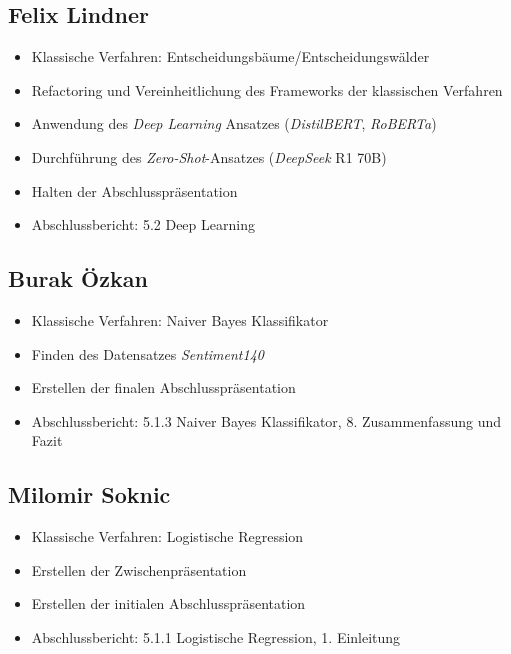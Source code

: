 \begin{multicols}{2}
\subsection{Felix Lindner}
\begin{itemize}
    \item Klassische Verfahren: Entscheidungsbäume/Entscheidungswälder
    \item Refactoring und Vereinheitlichung des Frameworks der klassischen Verfahren
    \item Anwendung des \textit{Deep Learning} Ansatzes (\textit{DistilBERT}, \textit{RoBERTa})
    \item Durchführung des \textit{Zero-Shot}-Ansatzes (\textit{DeepSeek} R1 70B)
    \item Halten der Abschlusspräsentation
    \item Abschlussbericht: 5.2 Deep Learning
\end{itemize}

\subsection{Burak Özkan}
\begin{itemize}
    \item Klassische Verfahren: Naiver Bayes Klassifikator
    \item Finden des Datensatzes \textit{Sentiment140}
    \item Erstellen der finalen Abschlusspräsentation
    \item Abschlussbericht: 5.1.3 Naiver Bayes Klassifikator, 8. Zusammenfassung und Fazit
\end{itemize}

\subsection{Milomir Soknic}
\begin{itemize}
    \item Klassische Verfahren: Logistische Regression
    \item Erstellen der Zwischenpräsentation
    \item Erstellen der initialen Abschlusspräsentation
    \item Abschlussbericht: 5.1.1 Logistische Regression, 1. Einleitung
\end{itemize}

\end{multicols}
